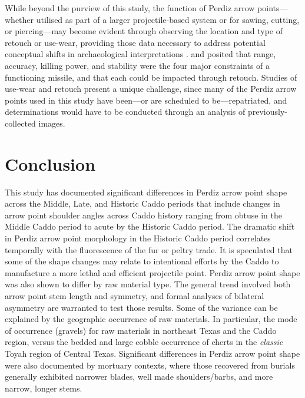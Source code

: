 \documentclass[review]{elsarticle}
\begin{document}
While beyond the purview of this study, the function of Perdiz arrow points---whether utilised as part of a larger projectile-based system or for sawing, cutting, or piercing---may become evident through observing the location and type of retouch or use-wear, providing those data necessary to address potential conceptual shifts in archaeological interpretations \citep{RN8990,RN8991,RN8992,RN6342}. \citet{RN8994} and \citet{RN8993} posited that range, accuracy, killing power, and stability were the four major constraints of a functioning missile, and that each could be impacted through retouch. Studies of use-wear and retouch present a unique challenge, since many of the Perdiz arrow points used in this study have been---or are scheduled to be---repatriated, and determinations would have to be conducted through an analysis of previously-collected images.

\section*{Conclusion}

This study has documented significant differences in Perdiz arrow point shape across the Middle, Late, and Historic Caddo periods that include changes in arrow point shoulder angles across Caddo history ranging from obtuse in the Middle Caddo period to acute by the Historic Caddo period. The dramatic shift in Perdiz arrow point morphology in the Historic Caddo period correlates temporally with the fluorescence of the fur or peltry trade. It is speculated that some of the shape changes may relate to intentional efforts by the Caddo to manufacture a more lethal and efficient projectile point. Perdiz arrow point shape was also shown to differ by raw material type. The general trend involved both arrow point stem length and symmetry, and formal analyses of bilateral asymmetry are warranted to test those results. Some of the variance can be explained by the geographic occurrence of raw materials. In particular, the mode of occurrence (gravels) for raw materials in northeast Texas and the Caddo region, versus the bedded and large cobble occurrence of cherts in the \textit{classic} Toyah region of Central Texas. Significant differences in Perdiz arrow point shape were also documented by mortuary contexts, where those recovered from burials generally exhibited narrower blades, well made shoulders/barbs, and more narrow, longer stems.
\end{document}

